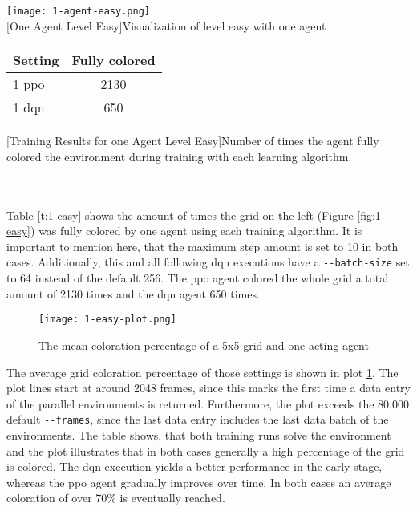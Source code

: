 \begin{minipage}{\textwidth}
  \begin{minipage}[b]{0.29\textwidth}
    \centering
    \texttt{[image: 1-agent-easy.png]}\\
    [One Agent Level Easy]{Visualization of level easy with one agent}\label{fig:1-easy}
  \end{minipage}
  \hfill
  \begin{minipage}[b]{0.69\textwidth}
    \centering
    \begin{tabular}{lc}\hline
      Setting & Fully colored \\ \hline
        1 ppo & 2130 \\
        1 dqn & 650 \\ \hline
      \end{tabular}
      [Training Results for one Agent Level Easy]{Number of times the agent fully colored the environment during training with each learning algorithm.}\label{t:1-easy}
    \end{minipage}
  \end{minipage}\\\\

Table \ref{t:1-easy} shows the amount of times the grid on the left (Figure \ref{fig:1-easy}) was fully colored by one agent using each training algorithm. It is important to mention here, that the maximum step amount is set to 10 in both cases. Additionally, this and all following dqn executions have a \verb|--batch-size| set to 64 instead of the default 256. The ppo agent colored the whole grid a total amount of 2130 times and the dqn agent 650 times.

\begin{figure}[hpbt]
    \centering
    \texttt{[image: 1-easy-plot.png]}\\
    \caption[Mean Grid Coloration Percentage of one Agent]{The mean coloration percentage of a 5x5 grid and one acting agent}\label{fig:1-easy-plot}
\end{figure}

The average grid coloration percentage of those settings is shown in plot \ref{fig:1-easy-plot}. The plot lines start at around 2048 frames, since this marks the first time a data entry of the parallel environments is returned. Furthermore, the plot exceeds the 80.000 default \verb|--frames|, since the last data entry includes the last data batch of the environments. The table shows, that both training runs solve the environment and the plot illustrates that in both cases generally a high percentage of the grid is colored. The dqn execution yields a better performance in the early stage, whereas the ppo agent gradually improves over time. In both cases an average coloration of over 70\% is eventually reached. 

